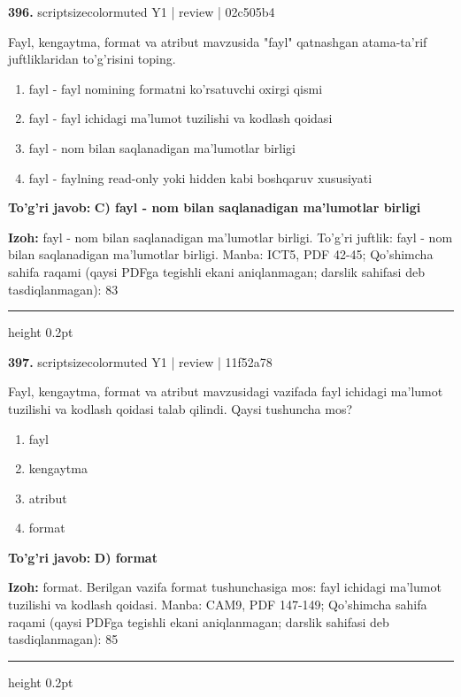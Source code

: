 \documentclass[10pt,a4paper]{article}
\begin{document}
{\bfseries\sffamily\color{ink} 396.} {scriptsizecolor{muted} Y1 | review | 02c505b4}
\par
Fayl, kengaytma, format va atribut mavzusida "fayl" qatnashgan atama-ta'rif juftliklaridan to'g'risini toping.
\begin{enumerate}[label=\Alph*),leftmargin=9mm]
\item fayl - fayl nomining formatni ko'rsatuvchi oxirgi qismi
\item fayl - fayl ichidagi ma'lumot tuzilishi va kodlash qoidasi
\item fayl - nom bilan saqlanadigan ma'lumotlar birligi
\item fayl - faylning read-only yoki hidden kabi boshqaruv xususiyati
\end{enumerate}
\begin{tcolorbox}[enhanced,breakable,colback=teal!4,colframe=teal!60!black,boxrule=0.45pt,arc=1.2mm,left=2.7mm,right=2.7mm,top=1.8mm,bottom=1.8mm,before skip=2mm,after skip=2mm]
{\bfseries\sffamily\color{teal}To'g'ri javob:} \textbf{C) fayl - nom bilan saqlanadigan ma'lumotlar birligi}
\par\smallskip
{\bfseries Izoh:} fayl - nom bilan saqlanadigan ma'lumotlar birligi. To'g'ri juftlik: fayl - nom bilan saqlanadigan ma'lumotlar birligi. Manba: ICT5, PDF 42-45; Qo'shimcha sahifa raqami (qaysi PDFga tegishli ekani aniqlanmagan; darslik sahifasi deb tasdiqlanmagan): 83
\end{tcolorbox}
\vspace{2mm}\hrule height 0.2pt\vspace{3mm}

{\bfseries\sffamily\color{ink} 397.} {scriptsizecolor{muted} Y1 | review | 11f52a78}
\par
Fayl, kengaytma, format va atribut mavzusidagi vazifada fayl ichidagi ma'lumot tuzilishi va kodlash qoidasi talab qilindi. Qaysi tushuncha mos?
\begin{enumerate}[label=\Alph*),leftmargin=9mm]
\item fayl
\item kengaytma
\item atribut
\item format
\end{enumerate}
\begin{tcolorbox}[enhanced,breakable,colback=teal!4,colframe=teal!60!black,boxrule=0.45pt,arc=1.2mm,left=2.7mm,right=2.7mm,top=1.8mm,bottom=1.8mm,before skip=2mm,after skip=2mm]
{\bfseries\sffamily\color{teal}To'g'ri javob:} \textbf{D) format}
\par\smallskip
{\bfseries Izoh:} format. Berilgan vazifa format tushunchasiga mos: fayl ichidagi ma'lumot tuzilishi va kodlash qoidasi. Manba: CAM9, PDF 147-149; Qo'shimcha sahifa raqami (qaysi PDFga tegishli ekani aniqlanmagan; darslik sahifasi deb tasdiqlanmagan): 85
\end{tcolorbox}
\vspace{2mm}\hrule height 0.2pt\vspace{3mm}
\end{document}
